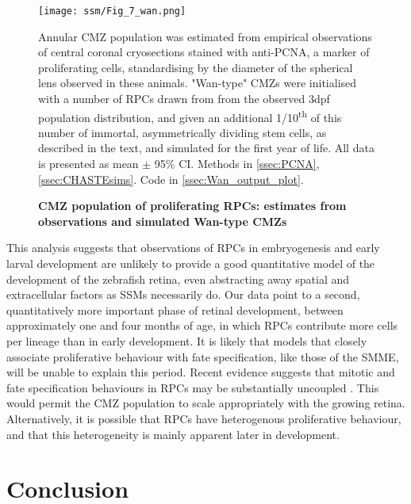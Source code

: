 \begin{figure}[!h]
\texttt{[image: ssm/Fig\_7\_wan.png]}   
\caption{{\bf CMZ population of proliferating RPCs: estimates from observations and simulated Wan-type CMZs}}
Annular CMZ population was estimated from empirical observations of central coronal cryosections stained with anti-PCNA, a marker of proliferating cells, standardising by the diameter of the spherical lens observed in these animals. "Wan-type" CMZs were initialised with a number of RPCs drawn from from the observed 3dpf population distribution, and given an additional 1/10\textsuperscript{th} of this number of immortal, asymmetrically dividing stem cells, as described in the text, and simulated for the first year of life. All data is presented as mean $\pm$ 95\% CI.
Methods in \autoref{ssec:PCNA}, \autoref{ssec:CHASTEsims}.
Code in \autoref{ssec:Wan_output_plot}.
\label{WanSim}
\end{figure}

This analysis suggests that observations of RPCs in embryogenesis and early larval development are unlikely to provide a good quantitative model of the development of the zebrafish retina, even abstracting away spatial and extracellular factors as SSMs necessarily do. Our data point to a second, quantitatively more important phase of retinal development, between approximately one and four months of age, in which RPCs contribute more cells per lineage than in early development. It is likely that models that closely associate proliferative behaviour with fate specification, like those of the SMME, will be unable to explain this period. Recent evidence suggests that mitotic and fate specification behaviours in RPCs may be substantially uncoupled \cite{Engerer2017}. This would permit the CMZ population to scale appropriately with the growing retina. Alternatively, it is possible that RPCs have heterogenous proliferative behaviour, and that this heterogeneity is mainly apparent later in development.

\section{Conclusion}

